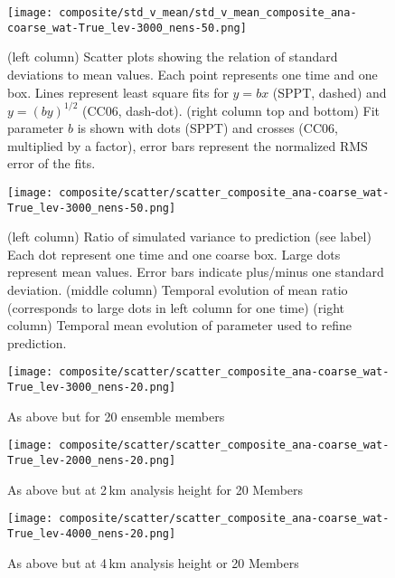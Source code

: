 \documentclass[a4paper, 12pt]{article}
\begin{document}
\begin{figure}[ht]
\noindent \centering
\texttt{[image: composite/std\_v\_mean/std\_v\_mean\_composite\_ana-coarse\_wat-True\_lev-3000\_nens-50.png]}\\
\caption{(left column) Scatter plots showing the relation of standard deviations to mean values. Each point represents one time and one box. Lines represent least square fits for $y=bx$ (SPPT, dashed) and $y = (by)^{1/2}$ (CC06, dash-dot). (right column top and bottom) Fit parameter $b$ is shown with dots (SPPT) and crosses (CC06, multiplied by a factor), error bars represent the normalized RMS error of the fits.} \label{fig:std_v_mean}
\end{figure}

\begin{figure}[ht]
\noindent \centering
\texttt{[image: composite/scatter/scatter\_composite\_ana-coarse\_wat-True\_lev-3000\_nens-50.png]}\\
\caption{(left column) Ratio of simulated variance to prediction (see label) Each dot represent one time and one coarse box. Large dots represent mean values. Error bars indicate plus/minus one standard deviation. (middle column) Temporal evolution of mean ratio (corresponds to large dots in left column for one time) (right column) Temporal mean evolution of parameter used to refine prediction.} \label{fig:scatter}
\end{figure}

\begin{figure}[ht]
\noindent \centering
\texttt{[image: composite/scatter/scatter\_composite\_ana-coarse\_wat-True\_lev-3000\_nens-20.png]}\\
\caption{As above but for 20 ensemble members} \label{fig:scatter_20mem}
\end{figure}

\begin{figure}[ht]
\noindent \centering
\texttt{[image: composite/scatter/scatter\_composite\_ana-coarse\_wat-True\_lev-2000\_nens-20.png]}\\
\caption{As above but at 2\,km analysis height for 20 Members} \label{fig:scatter_2000}
\end{figure}

\begin{figure}[ht]
\noindent \centering
\texttt{[image: composite/scatter/scatter\_composite\_ana-coarse\_wat-True\_lev-4000\_nens-20.png]}\\
\caption{As above but at 4\,km analysis height or 20 Members} \label{fig:scatter_4000}
\end{figure}
\end{document}
